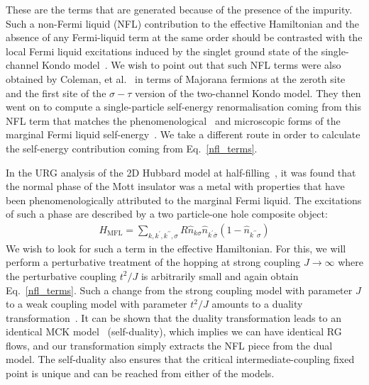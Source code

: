 \documentclass[reprint,prb,superscriptaddress]{revtex4-2}
\begin{document}
These are the terms that are generated because of the presence of the impurity. Such a non-Fermi liquid (NFL) contribution to the effective Hamiltonian and the absence of any Fermi-liquid term at the same order should be contrasted with the local Fermi liquid excitations induced by the singlet ground state of the single-channel Kondo model~\cite{nozieres1974fermi,wilson1975renormalization,hewson1993}. We wish to point out that such NFL terms were also obtained by Coleman, et al.~\cite{Coleman_tsvelik} in terms of Majorana fermions at the zeroth site and the first site of the \(\sigma-\tau\) version of the two-channel Kondo model. They then went on to compute a single-particle self-energy renormalisation coming from this NFL term that matches the phenomenological~\cite{varma2002singular} and microscopic forms of the marginal Fermi liquid self-energy~\cite{anirbanmott1,anirbanurg1}. We take a different route in order to calculate the self-energy contribution coming from Eq.~\ref{nfl_terms}.

In the URG analysis of the 2D Hubbard model at half-filling~\cite{anirbanurg1}, it was found that the normal phase of the Mott insulator was a metal with properties that have been phenomenologically attributed to the marginal Fermi liquid. The excitations of such a phase are described by a two particle-one hole composite object:
\begin{equation}\begin{aligned}
	\label{mfl_urg}
	H_\text{MFL} = \sum_{k,k^\prime,k^{\prime\prime},\sigma}R \hat n_{k\sigma} \hat n_{k^\prime \overline\sigma}\left(1 - \hat n_{k^{\prime\prime}\sigma}\right) 
\end{aligned}\end{equation}
We wish to look for such a term in the effective Hamiltonian. For this, we will perform a perturbative treatment of the hopping at strong coupling \(J \to \infty\) where the perturbative coupling \(t^2/J\) is arbitrarily small and again obtain Eq.~\ref{nfl_terms}. Such a change from the strong coupling model with parameter \(J\) to a weak coupling model with parameter \(t^2/J\) amounts to a duality transformation~\cite{kroha_kolf_2007,zitko_fabrizio_2017}. It can be shown that the duality transformation leads to an identical MCK model~\cite{kroha_kolf_2007} (self-duality), which implies we can have identical RG flows, and our transformation simply extracts the NFL piece from the dual model. The self-duality also ensures that the critical intermediate-coupling fixed point is unique and can be reached from either of the models.
\end{document}
